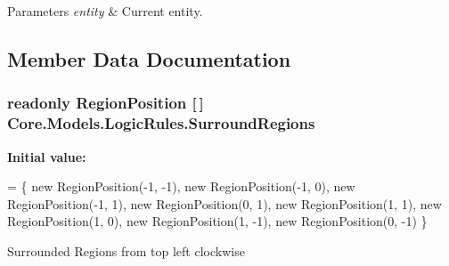 \begin{DoxyParams}{Parameters}
{\em entity} & Current entity.\\
\hline
\end{DoxyParams}


\subsection{Member Data Documentation}
\hypertarget{classCore_1_1Models_1_1LogicRules_a42380b97e68c7128580776742ef94e56}{}
\subsubsection[{Surround\+Regions}]{\setlength{\rightskip}{0pt plus 5cm}readonly {\bf Region\+Position} \mbox{[}$\,$\mbox{]} Core.\+Models.\+Logic\+Rules.\+Surround\+Regions\hspace{0.3cm}{\ttfamily [static]}}\label{classCore_1_1Models_1_1LogicRules_a42380b97e68c7128580776742ef94e56}
{\bfseries Initial value\+:}
\begin{DoxyCode}
=
        \{
                \textcolor{keyword}{new} RegionPosition(-1, -1),
                \textcolor{keyword}{new} RegionPosition(-1,  0),
                \textcolor{keyword}{new} RegionPosition(-1,  1),
                \textcolor{keyword}{new} RegionPosition(0,  1),
                \textcolor{keyword}{new} RegionPosition(1,  1),
                \textcolor{keyword}{new} RegionPosition(1,  0),
                \textcolor{keyword}{new} RegionPosition(1, -1),
                \textcolor{keyword}{new} RegionPosition(0, -1)
        \}
\end{DoxyCode}


Surrounded Regions from top left clockwise 

\hypertarget{classCore_1_1Models_1_1LogicRules_a3d587d8f781d3b37c26c501d003f3d4d}{}
